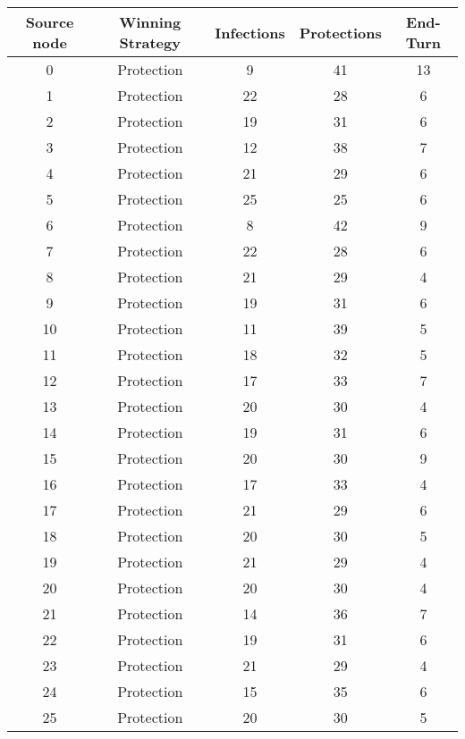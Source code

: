 \documentclass[results.tex]{subfiles}
\begin{document}
\begin{center}
  \begin{tabular}{| c || c | c | c | c |}
    \hline
    {\bfseries Source node} & {\bfseries Winning Strategy} & {\bfseries Infections} & {\bfseries Protections} & {\bfseries End-Turn} \\  %
    \hline\hline
    0 & Protection & 9 & 41 & 13 \\ 
    \hline
    1 & Protection & 22 & 28 & 6 \\ 
    \hline
    2 & Protection & 19 & 31 & 6 \\ 
    \hline
    3 & Protection & 12 & 38 & 7 \\ 
    \hline
    4 & Protection & 21 & 29 & 6 \\ 
    \hline
    5 & Protection & 25 & 25 & 6 \\ 
    \hline
    6 & Protection & 8 & 42 & 9 \\ 
    \hline
    7 & Protection & 22 & 28 & 6 \\ 
    \hline
    8 & Protection & 21 & 29 & 4 \\ 
    \hline
    9 & Protection & 19 & 31 & 6 \\ 
    \hline
    10 & Protection & 11 & 39 & 5 \\ 
    \hline
    11 & Protection & 18 & 32 & 5 \\ 
    \hline
    12 & Protection & 17 & 33 & 7 \\ 
    \hline
    13 & Protection & 20 & 30 & 4 \\ 
    \hline
    14 & Protection & 19 & 31 & 6 \\ 
    \hline
    15 & Protection & 20 & 30 & 9 \\ 
    \hline
    16 & Protection & 17 & 33 & 4 \\ 
    \hline
    17 & Protection & 21 & 29 & 6 \\ 
    \hline
    18 & Protection & 20 & 30 & 5 \\ 
    \hline
    19 & Protection & 21 & 29 & 4 \\ 
    \hline
    20 & Protection & 20 & 30 & 4 \\ 
    \hline
    21 & Protection & 14 & 36 & 7 \\ 
    \hline
    22 & Protection & 19 & 31 & 6 \\ 
    \hline
    23 & Protection & 21 & 29 & 4 \\ 
    \hline
    24 & Protection & 15 & 35 & 6 \\ 
    \hline
    25 & Protection & 20 & 30 & 5 \\ 

\end{tabular}
\end{center}
\end{document}

